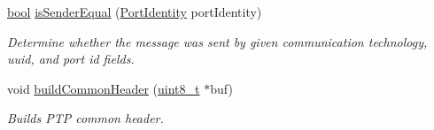 \begin{DoxyCompactItemize}
\hyperlink{avb__gptp_8h_af6a258d8f3ee5206d682d799316314b1}{bool} \hyperlink{class_p_t_p_message_common_aa13b7c21bfbc95ca14890dea687da20b}{is\+Sender\+Equal} (\hyperlink{class_port_identity}{Port\+Identity} port\+Identity)
\begin{DoxyCompactList}\small\item\em Determine whether the message was sent by given communication technology, uuid, and port id fields. \end{DoxyCompactList}\item 
void \hyperlink{class_p_t_p_message_common_a66c6d7a38fc74d84b68e13216c82a4e6}{build\+Common\+Header} (\hyperlink{stdint_8h_aba7bc1797add20fe3efdf37ced1182c5}{uint8\+\_\+t} $\ast$buf)
\begin{DoxyCompactList}\small\item\em Builds P\+TP common header. \end{DoxyCompactList}\end{DoxyCompactItemize}
